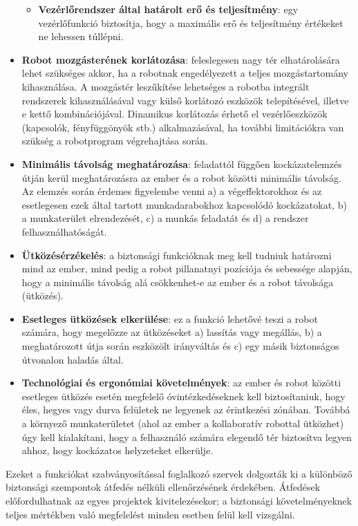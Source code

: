 \documentclass[../documentation.tex]{subfiles}
\begin{document}
\begin{itemize}
\begin{itemize}
		\item \textbf{Vezérlőrendszer által határolt erő és teljesítmény}: egy vezérlőfunkció biztosítja, hogy a maximális erő és teljesítmény értékeket ne lehessen túllépni.
	\end{itemize}
	\item \textbf{Robot mozgásterének korlátozása}: feleslegesen nagy tér elhatárolására lehet szükséges akkor, ha a robotnak engedélyezett a teljes mozgástartomány kihasználása. A mozgástér leszűkítése lehetséges a robotba integrált rendszerek kihasználásával vagy külső korlátozó eszközök telepítésével, illetve e kettő kombinációjával. Dinamikus korlátozás érhető el vezérlőeszközök (kapcsolók, fényfüggönyök stb.) alkalmazásával, ha további limitációkra van szükség a robotprogram végrehajtása során.
	\item \textbf{Minimális távolság meghatározása}: feladattól függően kockázatelemzés útján kerül meghatározásra az ember és a robot közötti minimális távolság. Az elemzés során érdemes figyelembe venni a) a végeffektorokhoz és az esetlegesen ezek által tartott munkadarabokhoz kapcsolódó kockázatokat, b) a munkaterület elrendezését, c) a munkás feladatát és d) a rendszer felhasználhatóságát.
	\item \textbf{Ütközésérzékelés}: a biztonsági funkcióknak meg kell tudniuk határozni mind az ember, mind pedig a robot pillanatnyi pozíciója és sebessége alapján, hogy a minimális távolság alá csökkenhet-e az ember és a robot távolsága (ütközés).
	\item \textbf{Esetleges ütközések elkerülése}: ez a funkció lehetővé teszi a robot számára, hogy megelőzze az ütközéseket a) lassítás vagy megállás, b) a meghatározott útja során eszközölt irányváltás és c) egy másik biztonságos útvonalon haladás által.
	\item \textbf{Technológiai és ergonómiai követelmények}: az ember és robot közötti esetleges ütközés esetén megfelelő óvintézkedéseknek kell biztosítaniuk, hogy éles, hegyes vagy durva felületek ne legyenek az érintkezési zónában. Továbbá a környező munkaterületet (ahol az ember a kollaboratív robottal ütközhet) úgy kell kialakítani, hogy a felhasználó számára elegendő tér biztosítva legyen ahhoz, hogy kockázatos helyzeteket elkerülje.
\end{itemize}

Ezeket a funkciókat szabványosítással foglalkozó szervek dolgozták ki a különböző biztonsági szempontok átfedés nélküli ellenőrzésének érdekében. Átfedések előfordulhatnak az egyes projektek kivitelezésekor; a biztonsági követelményeknek teljes mértékben való megfelelést minden esetben felül kell vizsgálni.
\end{document}
